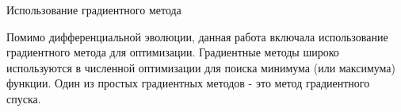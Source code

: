 \documentclass{beamer}
\begin{document}
\begin{frame}{Использование градиентного метода}

	Помимо дифференциальной эволюции, данная работа включала использование градиентного метода для оптимизации. Градиентные методы широко используются в численной оптимизации для поиска минимума (или максимума) функции. Один из простых градиентных методов - это метод градиентного спуска.



\end{frame}
\end{document}
